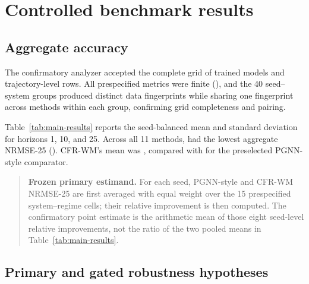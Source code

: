 \section{Controlled benchmark results}

\subsection{Aggregate accuracy}

The confirmatory analyzer accepted the complete grid of \ConfirmatoryRuns{}
trained models and \ConfirmatoryTrajectories{} trajectory-level rows. All
prespecified metrics were finite (\AllMetricsFinite), and the 40 seed--system
groups produced \UniqueDataHashes{} distinct data fingerprints while sharing
one fingerprint across methods within each group, confirming grid completeness
and pairing.

Table~\ref{tab:main-results} reports the seed-balanced mean and standard
deviation for horizons 1, 10, and 25. Across all 11 methods, \BestMethod{}
had the lowest aggregate NRMSE-25 (\BestNRMSE). CFR-WM's mean was
\CFRNRMSE{}, compared with \PGNNNRMSE{} for the preselected PGNN-style comparator.

\begin{table}[t]
\centering
\caption{Confirmatory accuracy over the fixed five-system, three-regime
benchmark. Entries are means $\pm$ SD across eight seed-level, cell-balanced
aggregates. Bold marks the lowest aggregate NRMSE-25. Parameter counts are means
over the five system-specific input dimensions; all methods received the same six-trial
validation search budget.}
\label{tab:main-results}
\resizebox{\textwidth}{!}{}
\end{table}

\begin{quote}
\small\textbf{Frozen primary estimand.} For each seed, PGNN-style and CFR-WM
NRMSE-25 are first averaged with equal weight over the 15 prespecified
system--regime cells; their relative improvement is then computed. The
confirmatory point estimate is the arithmetic mean of those eight seed-level
relative improvements, not the ratio of the two pooled means in
Table~\ref{tab:main-results}.
\end{quote}

\subsection{Primary and gated robustness hypotheses}

